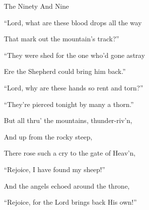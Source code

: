 \documentclass[12pt]{book}
\begin{document}
\begin{song}{The Ninety And Nine}{}
  \WBPageBrk

  \begin{SBVerse}
    ``Lord, what are these blood drops all the way

    That mark out the mountain's track?''

    ``They were shed for the one who'd gone astray

    Ere the Shepherd could bring him back.''

    ``Lord, why are these hands so rent and torn?''

    ``They're pierced tonight by many a thorn.''
  \end{SBVerse}

  \begin{SBVerse}
    But all thru' the mountains, thunder-riv'n,

    And up from the rocky steep,

    There rose such a cry to the gate of Heav'n,

    ``Rejoice, I have found my sheep!''

    And the angels echoed around the throne,

    ``Rejoice, for the Lord brings back His own!''
  \end{SBVerse}
\end{song}
\end{document}
